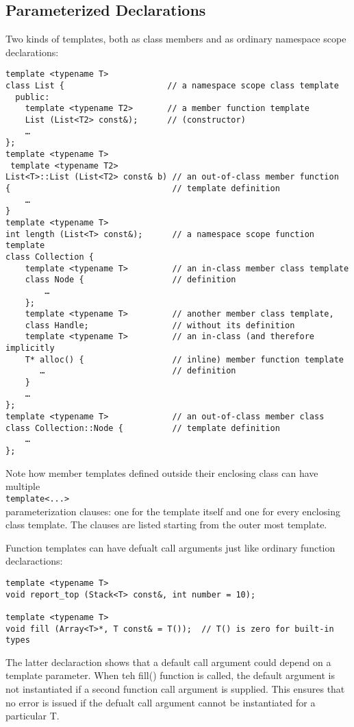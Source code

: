 \documentclass[11pt, a4paper]{book}
\begin{document}
\begin{itemize}
\subsection{Parameterized Declarations}
Two kinds of templates, both as class members and as ordinary namespace scope declarations:
\begin{verbatim}
template <typename T> 
class List {                     // a namespace scope class template 
  public: 
    template <typename T2>       // a member function template 
    List (List<T2> const&);      // (constructor) 
    … 
}; 
template <typename T> 
 template <typename T2> 
List<T>::List (List<T2> const& b) // an out-of-class member function 
{                                 // template definition 
    … 
} 
template <typename T> 
int length (List<T> const&);      // a namespace scope function template 
class Collection { 
    template <typename T>         // an in-class member class template 
    class Node {                  // definition 
        … 
    }; 
    template <typename T>         // another member class template, 
    class Handle;                 // without its definition 
    template <typename T>         // an in-class (and therefore implicitly 
    T* alloc() {                  // inline) member function template 
       …                          // definition 
    } 
    … 
}; 
template <typename T>             // an out-of-class member class 
class Collection::Node {          // template definition 
    … 
}; 
\end{verbatim}

Note how member templates defined outside their enclosing class can have multiple \\\verb|template<...>|\\ parameterization clauses: one for the template itself and one for every enclosing class template. The clauses are listed starting from the outer most template.

Function templates can have defualt call arguments just like ordinary function declaractions:
\begin{verbatim}
template <typename T> 
void report_top (Stack<T> const&, int number = 10); 

template <typename T> 
void fill (Array<T>*, T const& = T());  // T() is zero for built-in types 
\end{verbatim}

The latter declaraction shows that a default call argument could depend on a template parameter. When teh fill() function is called, the default argument is not instantiated if a second function call argument is supplied. This ensures that no error is issued if the defualt call argument cannot be instantiated for a particular T.


\end{itemize}
\end{document}
